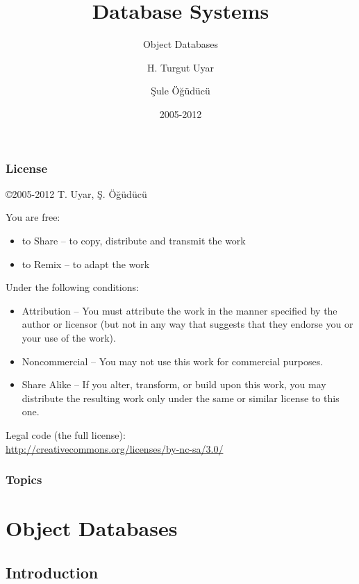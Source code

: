 \documentclass[dvipsnames]{beamer}
\title{Database Systems}
\subtitle{Object Databases}
\author{H. Turgut Uyar \and Şule Öğüdücü}
\date{2005-2012}
\theoremstyle{plain}
\begin{document}
\begin{frame}
  \titlepage
\end{frame}

\begin{frame}
  \frametitle{License}

  \hfill
  \copyright 2005-2012 T. Uyar, Ş. Öğüdücü

  \vfill
  \begin{tiny}
    You are free:
    \begin{itemize}
      \item to Share -- to copy, distribute and transmit the work
      \item to Remix -- to adapt the work
    \end{itemize}

    Under the following conditions:
    \begin{itemize}
      \item Attribution -- You must attribute the work in the manner specified by
        the author or licensor (but not in any way that suggests that they
        endorse you or your use of the work).

      \item Noncommercial -- You may not use this work for commercial purposes.

      \item Share Alike -- If you alter, transform, or build upon this work, you
        may distribute the resulting work only under the same or similar license
        to this one.
    \end{itemize}
  \end{tiny}

  \vfill
  Legal code (the full license):\\
  \url{http://creativecommons.org/licenses/by-nc-sa/3.0/}
\end{frame}

\begin{frame}
  \frametitle{Topics}
  \tableofcontents
\end{frame}

\section{Object Databases}

\subsection{Introduction}
\end{document}
